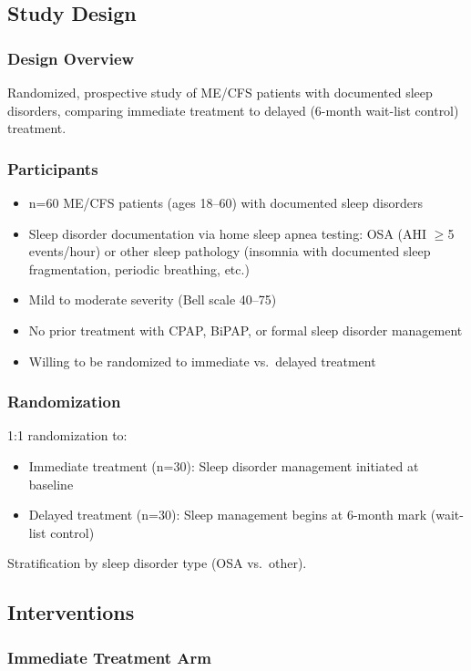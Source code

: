\subsection{Study Design}

\subsubsection{Design Overview}
Randomized, prospective study of ME/CFS patients with documented sleep disorders, comparing immediate treatment to delayed (6-month wait-list control) treatment.

\subsubsection{Participants}
\begin{itemize}
    \item n=60 ME/CFS patients (ages 18--60) with documented sleep disorders
    \item Sleep disorder documentation via home sleep apnea testing: OSA (AHI $\geq$5 events/hour) or other sleep pathology (insomnia with documented sleep fragmentation, periodic breathing, etc.)
    \item Mild to moderate severity (Bell scale 40--75)
    \item No prior treatment with CPAP, BiPAP, or formal sleep disorder management
    \item Willing to be randomized to immediate vs.\ delayed treatment
\end{itemize}

\subsubsection{Randomization}
1:1 randomization to:
\begin{itemize}
    \item Immediate treatment (n=30): Sleep disorder management initiated at baseline
    \item Delayed treatment (n=30): Sleep management begins at 6-month mark (wait-list control)
\end{itemize}

Stratification by sleep disorder type (OSA vs.\ other).

\subsection{Interventions}

\subsubsection{Immediate Treatment Arm}

